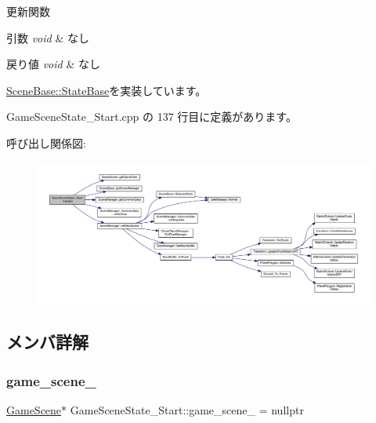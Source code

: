 更新関数 


\begin{DoxyParams}{引数}
{\em void} & なし \\
\hline
\end{DoxyParams}

\begin{DoxyRetVals}{戻り値}
{\em void} & なし \\
\hline
\end{DoxyRetVals}


\mbox{\hyperlink{class_scene_base_1_1_state_base_ad2c6c8fd9f020eb02f64f394edee129c}{Scene\+Base\+::\+State\+Base}}を実装しています。



 Game\+Scene\+State\+\_\+\+Start.\+cpp の 137 行目に定義があります。

呼び出し関係図\+:
\nopagebreak
\begin{figure}[H]
\begin{center}
\leavevmode
\includegraphics[width=350pt]{class_game_scene_state___start_ae11bb8d8ea9eae4fea2a9acf33dd1c8b_cgraph}
\end{center}
\end{figure}


\subsection{メンバ詳解}
\mbox{\label{class_game_scene_state___start_af9389c7c8496419a6a4a3d3339acd94f}} 
\subsubsection{\texorpdfstring{game\+\_\+scene\+\_\+}{game\_scene\_}}
{\footnotesize\ttfamily \mbox{\hyperlink{class_game_scene}{Game\+Scene}}$\ast$ Game\+Scene\+State\+\_\+\+Start\+::game\+\_\+scene\+\_\+ = nullptr\hspace{0.3cm}{\ttfamily [protected]}}



